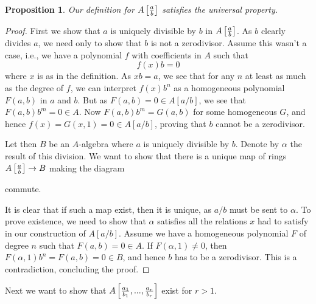 \documentclass[12pt,a4paper,leqno]{article}
\theoremstyle{plain}
\newtheorem{prop}[theo]{Proposition}
\theoremstyle{definition}
\theoremstyle{remark}
\begin{document}
\begin{prop}
Our definition for $A \left[ {a \over b} \right]$ satisfies the universal property. 
\end{prop}
\begin{proof}
First we show that $a$ is uniquely divisible by $b$ in $A \left[ {a \over b} \right]$. As $b$ clearly divides $a$, we need only to show that $b$ is not a zerodivisor. Assume this wasn't a case, i.e., we have a polynomial $f$ with coefficients in $A$ such that
\begin{equation*}
f(x) b = 0
\end{equation*}
where $x$ is as in the definition. As $xb = a$, we see that for any $n$ at least as much as the degree of $f$, we can interpret $f(x)b^n$ as a homogeneous polynomial $F(a,b)$ in $a$ and $b$. But as $F(a,b) = 0 \in A[a/b]$, we see that $F(a,b) b^m = 0 \in A$. Now $F(a,b) b^m = G(a,b)$ for some homogeneous $G$, and hence $f(x) = G(x,1) = 0 \in A[a/b]$, proving that $b$ cannot be a zerodivisor. 

Let then $B$ be an $A$-algebra where $a$ is uniquely divisible by $b$. Denote by $\alpha$ the result of this division. We want to show that there is a unique map of rings $A \left[ {a \over b} \right] \to B$ making the diagram
\begin{center}
\end{center}
commute.

It is clear that if such a map exist, then it is unique, as $a/b$ must be sent to $\alpha$. To prove existence, we need to show that $\alpha$ satisfies all the relations $x$ had to satisfy in our construction of $A[a/b]$. Assume we have a homogeneous polynomial $F$ of degree $n$ such that $F(a,b) = 0 \in A$. If $F(\alpha, 1) \not = 0$, then $F(\alpha, 1) b^n =  F(a,b) = 0 \in B$, and hence $b$ has to be a zerodivisor. This is a contradiction, concluding the proof.
\end{proof}

Next we want to show that $A \left[ {a_1 \over b_1}, ... , {a_r \over b_r} \right]$ exist for $r>1$.
\end{document}

